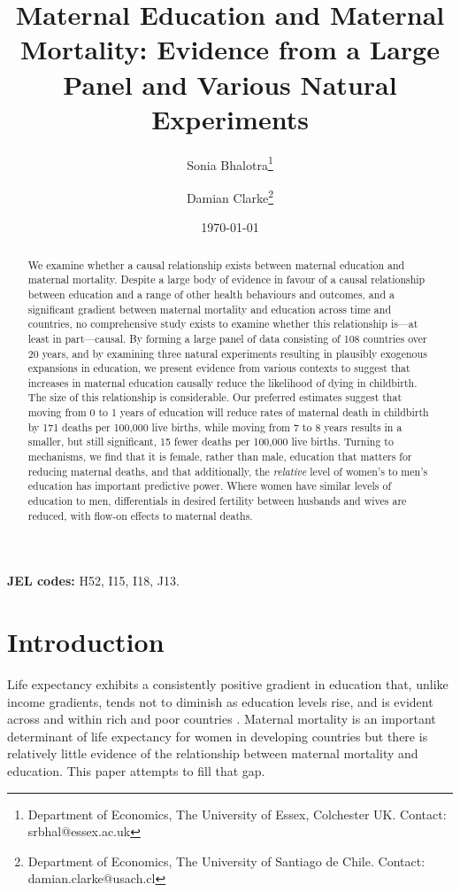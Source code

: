 \documentclass{article}[12pt,subeqn]
\title{Maternal Education and Maternal Mortality: 
Evidence from a Large Panel and Various Natural Experiments}
\author{Sonia Bhalotra\thanks{Department of Economics, The University of Essex,
    Colchester UK. Contact: srbhal@essex.ac.uk}
  \and{Damian Clarke\thanks{Department of Economics, The University of Santiago
      de Chile. Contact: damian.clarke@usach.cl}}}
\date{\today}
\begin{document}
\begin{spacing}{1.4}

\maketitle

\begin{abstract}
We examine whether a causal relationship exists between maternal education and 
maternal mortality. Despite a large body of evidence in favour of a causal 
relationship between education and a range of other health behaviours and 
outcomes, and a significant gradient between maternal mortality and education 
across time and countries, no comprehensive study exists to examine whether this 
relationship is---at least in part---causal.  By forming a large panel of data 
consisting of 108 countries over 20 years, and by examining three natural 
experiments resulting in plausibly exogenous expansions in education, we present 
evidence from various contexts to suggest that increases in maternal education
causally reduce the likelihood of dying in childbirth.  The size of this
relationship is considerable.  Our preferred estimates suggest that moving from 0
to 1 years of education will reduce rates of maternal death in childbirth by 171
deaths per 100,000 live births, while moving from 7 to 8 years results in a
smaller, but still significant, 15 fewer deaths per 100,000 live births.  Turning
to mechanisms, we find that it is female, rather than male, education that
matters for reducing maternal deaths, and that additionally, the \emph{relative}
level of women's to men's education has important predictive power.  Where women
have similar levels of education to men, differentials in desired fertility
between husbands and wives are reduced, with flow-on effects to maternal deaths.
\end{abstract}
\hspace{8mm} \textbf{JEL codes:} H52, I15, I18, J13.

\newpage
\section{Introduction}
Life expectancy exhibits a consistently positive gradient in education that, 
unlike income gradients, tends not to diminish as education levels rise, and is 
evident across and within rich and poor countries \citep{RichardsBarry1998, 
KunstMackenbach1994, EloPreston1996, LlerasMuney2005, Mearaetal2008}. Maternal 
mortality is an important determinant of life expectancy for women in developing 
countries but there is relatively little evidence of the relationship between
maternal mortality and education. This paper attempts to fill that gap.


\end{spacing}
\end{document}
